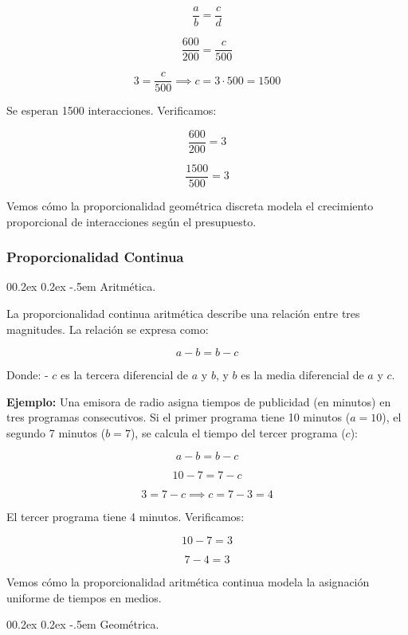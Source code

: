\documentclass[
  stu,
  floatsintext,
  longtable,
  a4paper,
  nolmodern,
  notxfonts,
  notimes,
  colorlinks=true,linkcolor=blue,citecolor=blue,urlcolor=blue]{apa7}
\makeatletter
\renewcommand{\paragraph}{\@startsection{paragraph}{4}{\parindent}%
	{0\baselineskip \@plus 0.2ex \@minus 0.2ex}%
	{-.5em}%
	{\normalfont\normalsize\bfseries\typesectitle}}
\makeatother
\begin{document}
\[
\frac{a}{b} = \frac{c}{d}
\]

\[
\frac{600}{200} = \frac{c}{500}
\]

\[
3 = \frac{c}{500} \implies c = 3 \cdot 500 = 1500
\]

Se esperan 1500 interacciones. Verificamos:

\[
\frac{600}{200} = 3
\]

\[
\frac{1500}{500} = 3
\]

Vemos cómo la proporcionalidad geométrica discreta modela el crecimiento
proporcional de interacciones según el presupuesto.

\subsubsection{Proporcionalidad
Continua}\label{proporcionalidad-continua}

\paragraph{Aritmética.}\label{aritmuxe9tica-1}

La proporcionalidad continua aritmética describe una relación entre tres
magnitudes. La relación se expresa como:

\[
a - b = b - c
\]

Donde: - \(c\) es la tercera diferencial de \(a\) y \(b\), y \(b\) es la
media diferencial de \(a\) y \(c\).

\textbf{Ejemplo:} Una emisora de radio asigna tiempos de publicidad (en
minutos) en tres programas consecutivos. Si el primer programa tiene 10
minutos (\(a = 10\)), el segundo 7 minutos (\(b = 7\)), se calcula el
tiempo del tercer programa (\(c\)):

\[
a - b = b - c
\]

\[
10 - 7 = 7 - c
\]

\[
3 = 7 - c \implies c = 7 - 3 = 4
\]

El tercer programa tiene 4 minutos. Verificamos:

\[
10 - 7 = 3
\]

\[
7 - 4 = 3
\]

Vemos cómo la proporcionalidad aritmética continua modela la asignación
uniforme de tiempos en medios.

\paragraph{Geométrica.}\label{geomuxe9trica-1}
\end{document}
